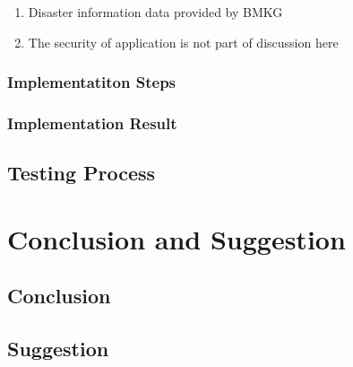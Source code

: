 \begin{enumerate}
\item Disaster information data provided by BMKG
\item The security of application is not part of discussion here 
\end{enumerate}

\subsubsection{Implementatiton Steps}

\subsubsection{Implementation Result}
\subsection{Testing Process}
\section{Conclusion and Suggestion}
\subsection{Conclusion}
\subsection{Suggestion}